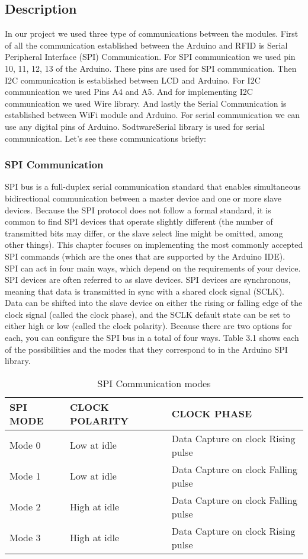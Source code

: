 \documentclass[12pt]{article}
\begin{document}
\subsection{Description}
\hspace*{1 cm}In our project we used three type of communications between the modules. First of all the communication established between the Arduino and RFID is Serial Peripheral Interface (SPI) Communication. For SPI communication we used pin 10, 11, 12, 13 of the Arduino. These pins are used for SPI communication. Then I2C communication is established between LCD and Arduino. For I2C communication we used Pins A4 and A5. And for implementing I2C communication we used Wire library. And lastly the Serial Communication is established between WiFi module and Arduino. For serial communication  we can use any digital pins of Arduino. SodtwareSerial library is used for serial communication. Let's see these communications briefly:
\subsubsection{SPI Communication}
\hspace*{1 cm}SPI bus is a full-duplex serial communication standard that enables simultaneous bidirectional communication between a master device and one or more slave devices. Because the SPI protocol does not follow a formal standard, it is common to find SPI devices that operate slightly different (the number of transmitted bits may differ, or the slave select line might be omitted, among other things). This chapter focuses on implementing the most commonly accepted SPI commands (which are the ones that are supported by the Arduino IDE).\\
\hspace*{1 cm}SPI can act in four main ways, which depend on the requirements of your device. SPI devices are often referred to as slave devices. SPI devices are synchronous, meaning that data is transmitted in sync with a shared clock signal (SCLK). Data can be shifted into the slave device on either the rising or falling edge of the clock signal (called the clock phase), and the SCLK default state can be set to either high or low (called the clock polarity). Because there are two options for each, you can configure the SPI bus in a total of four ways. Table 3.1 shows each of the possibilities and the modes that they correspond to in the Arduino SPI library.
\begin{table}[h]
\centering
\begin{tabular}{| l | l | l |}
\hline
\textbf{SPI MODE} & \textbf{CLOCK POLARITY} & \textbf{CLOCK PHASE}\\
\hline
Mode 0 & Low at idle & Data Capture on clock Rising pulse \\
Mode 1 & Low at idle & Data Capture on clock Falling pulse \\
Mode 2 & High at idle & Data Capture on clock Falling pulse \\
Mode 3 & High at idle & Data Capture on clock Rising pulse \\
\hline
\end{tabular}
\caption{SPI Communication modes}
\end{table}
\end{document}
